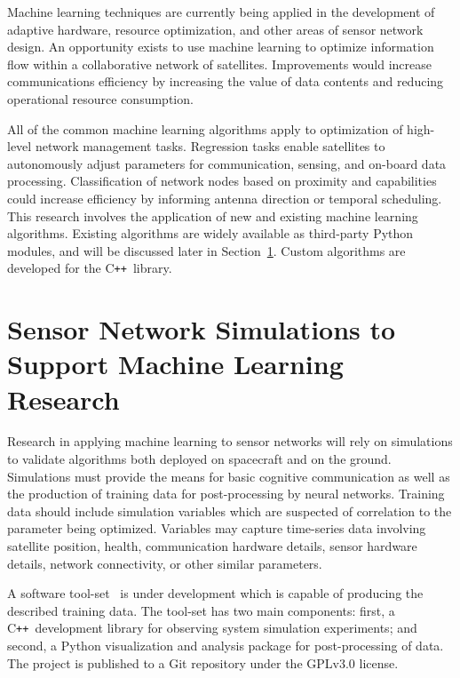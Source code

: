 \documentclass[conference]{IEEEtran}
\newcommand{\project}{{\sc{Collaborate}}~}
\newcommand{\cpp}{C\texttt{++}~}
\begin{document}
Machine learning techniques are currently being applied in the development of adaptive hardware, resource optimization, and other areas of sensor network design.  An opportunity exists to use machine learning to optimize information flow within a collaborative network of satellites.  Improvements would increase communications efficiency by increasing the value of data contents and reducing operational resource consumption.

All of the common machine learning algorithms apply to optimization of high-level network management tasks.  Regression tasks enable satellites to autonomously adjust parameters for communication, sensing, and on-board data processing.  Classification of network nodes based on proximity and capabilities could increase efficiency by informing antenna direction or temporal scheduling.  This research involves the application of new and existing machine learning algorithms.  Existing algorithms are widely available as third-party Python modules, and will be discussed later in Section~\ref{sec:software}.  Custom algorithms are developed for the \cpp library.




\section{Sensor Network Simulations to Support Machine Learning Research}
\label{sec:software}

Research in applying machine learning to sensor networks will rely on simulations to validate algorithms both deployed on spacecraft and on the ground.  Simulations must provide the means for basic cognitive communication as well as the production of training data for post-processing by neural networks.  Training data should include simulation variables which are suspected of correlation to the parameter being optimized.  Variables may capture time-series data involving satellite position, health, communication hardware details, sensor hardware details, network connectivity, or other similar parameters.

A software tool-set \project is under development which is capable of producing the described training data.  The tool-set has two main components: first, a \cpp development library for observing system simulation experiments; and second, a Python visualization and analysis package for post-processing of data.  The project is published to a Git repository under the GPLv3.0 license.
\end{document}
